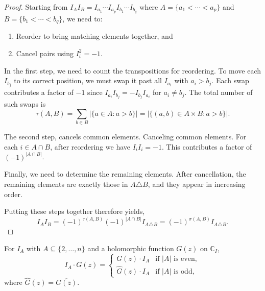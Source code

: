 \documentclass[11pt]{amsart}
\begin{document}
\begin{proof}
Starting from $I_A I_B = I_{a_1} \cdots I_{a_p} I_{b_1} \cdots I_{b_q}$ where $A = \{a_1 < \cdots < a_p\}$ and $B = \{b_1 < \cdots < b_q\}$, we need to:
\begin{enumerate}
    \item Reorder to bring matching elements together, and
    \item Cancel pairs using $I_i^2 = -1$.
\end{enumerate}

In the first step, we need to count the transpositions for reordering.  To move each $I_{b_j}$ to its correct position, we must swap it past all $I_{a_i}$ with $a_i > b_j$. Each swap contributes a factor of $-1$ since $I_{a_i} I_{b_j} = -I_{b_j} I_{a_i}$ for $a_i \neq b_j$.  The total number of such swaps is
\[
\tau(A, B) = \sum_{b \in B} |\{a \in A : a > b\}| = |\{(a,b) \in A \times B : a > b\}|.
\]

The second step, cancels common elements.  Canceling common elements.  For each $i \in A \cap B$, after reordering we have $I_i I_i = -1$. This contributes a factor of $(-1)^{|A \cap B|}$.

Finally, we need to determine the remaining elements.  After cancellation, the remaining elements are exactly those in $A \triangle B$, and they appear in increasing order.

Putting these steps together therefore yields,
\[
I_A I_B = (-1)^{\tau(A,B)}  (-1)^{|A \cap B|}  I_{A \triangle B} = (-1)^{\sigma(A,B)} I_{A \triangle B}.
\]
\end{proof}

\begin{lemma}
\label{lem:conjugation}
For $I_A$ with $A \subseteq \{2, \ldots, n\}$ and a holomorphic function $G(z)$ on $\mathbb{C}_I$,
\[
I_A \cdot G(z) =
\begin{cases}
G(z) \cdot I_A & \text{if } |A| \text{ is even}, \\
\hat{G}(z) \cdot I_A & \text{if } |A| \text{ is odd},
\end{cases}
\]
where $\hat{G}(z) = \overline{G(\bar{z})}$.
\end{lemma}
\end{document}
